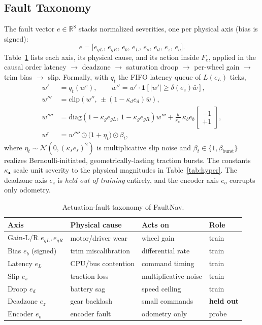\documentclass[journal]{IEEEtran}
\newcommand{\R}{\mathbb{R}}
\begin{document}
\subsection{Fault Taxonomy}\label{sec:taxonomy}
The fault vector $e \in \R^{8}$ stacks normalized severities, one per
physical axis (bias is signed):
\begin{equation}
e = \big[e_{gL},\, e_{gR},\, e_{b},\, e_{L},\, e_{s},\, e_{d},\,
        e_{z},\, e_{o}\big].
\end{equation}
Table~\ref{tab:faults} lists each axis, its physical cause, and its action
inside $F_e$, applied in the causal order latency $\rightarrow$ deadzone
$\rightarrow$ saturation droop $\rightarrow$ per-wheel gain $\rightarrow$
trim bias $\rightarrow$ slip. Formally, with $q_t$ the FIFO latency queue of
$L(e_L)$ ticks,
\begin{align}
w' &= q_t\!\left(w^{c}\right), \qquad
w'' = w' \cdot \mathbf{1}\!\left[|w'| \ge \delta(e_z)\bar{w}\right],
\nonumber\\
w''' &= \mathrm{clip}\!\left(w'',\, \pm(1 - \kappa_d e_d)\bar{w}\right),
\nonumber\\
w'''' &= \mathrm{diag}\!\left(1 - \kappa_g e_{gL},\, 1 - \kappa_g
e_{gR}\right) w''' + \tfrac{b}{r_w}\,\kappa_b e_b
\begin{bmatrix}-1\\ +1\end{bmatrix},
\nonumber\\
w^{r} &= w'''' \odot \big(1 + \eta_t\big) \odot \beta_t,
\label{eq:faultop}
\end{align}
where $\eta_t \sim \mathcal{N}(0, (\kappa_s e_s)^2)$ is multiplicative slip
noise and $\beta_t \in \{1, \beta_{\mathrm{burst}}\}$ realizes
Bernoulli-initiated, geometrically-lasting traction bursts. The constants
$\kappa_\bullet$ scale unit severity to the physical magnitudes in
Table~\ref{tab:hyper}. The deadzone axis $e_z$ is \emph{held out of
training} entirely, and the encoder axis $e_o$ corrupts only odometry.

\begin{table}[!t]
\centering
\caption{Actuation-fault taxonomy of FaultNav.}
\label{tab:faults}
\footnotesize
\setlength{\tabcolsep}{4pt}
\begin{tabular}{llll}
\toprule
Axis & Physical cause & Acts on & Role \\
\midrule
Gain-L/R $e_{gL}, e_{gR}$ & motor/driver wear & wheel gain & train \\
Bias $e_b$ (signed) & trim miscalibration & differential rate & train \\
Latency $e_L$ & CPU/bus contention & command timing & train \\
Slip $e_s$ & traction loss & multiplicative noise & train \\
Droop $e_d$ & battery sag & speed ceiling & train \\
Deadzone $e_z$ & gear backlash & small commands & \textbf{held out} \\
Encoder $e_o$ & encoder fault & odometry only & probe \\
\bottomrule
\end{tabular}
\end{table}
\end{document}
